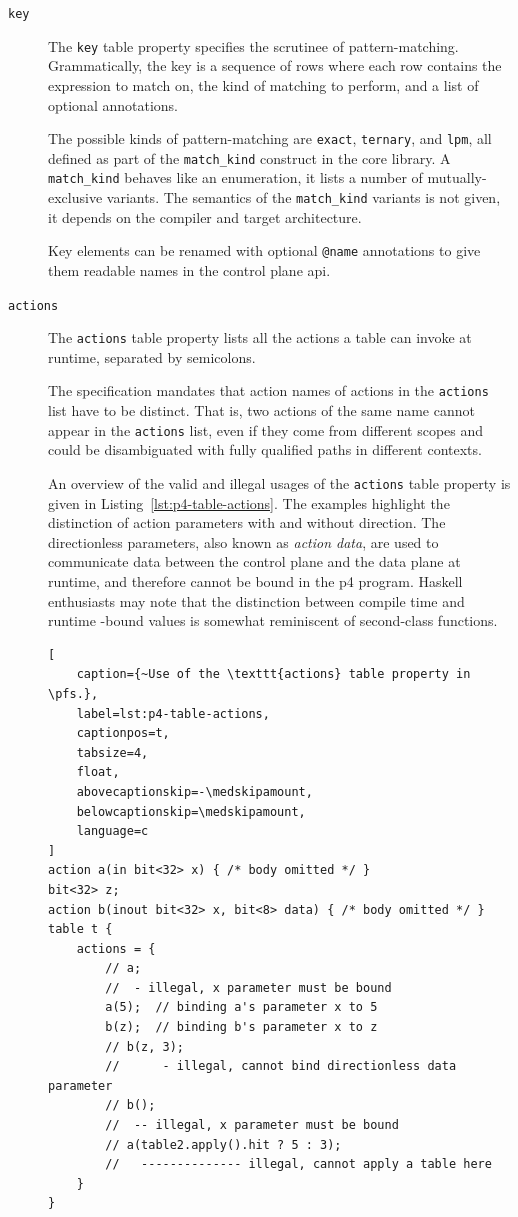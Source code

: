 \begin{description}

\item[\texttt{key}] The \texttt{key} table property specifies the scrutinee of
pattern-matching. Grammatically, the key is a sequence of rows where each row
contains the expression to match on, the kind of matching to perform, and a list
of optional annotations.

The possible kinds of pattern-matching are \texttt{exact}, \texttt{ternary}, and
\texttt{lpm}, all defined as part of the \texttt{match\_kind} construct in the
core library. A
\texttt{match\_kind} behaves like an enumeration, it lists a number of
mutually-exclusive variants. The semantics of the \texttt{match\_kind} variants
is not given, it depends on the compiler and target architecture.

Key elements can be renamed with optional \texttt{@name} annotations to give
them readable names in the control plane \acrshort{api}.

\item[\texttt{actions}] The \texttt{actions} table property lists all the
actions a table can invoke at runtime, separated by semicolons.

The specification mandates that action names of actions in the \texttt{actions}
list have to be distinct. That is, two actions of the same name cannot appear in
the \texttt{actions} list, even if they come from different scopes and could be
disambiguated with fully qualified paths in different contexts.

An overview of the valid and illegal usages of the \texttt{actions} table
property is given in Listing~\ref{lst:p4-table-actions}. The examples highlight
the distinction of action parameters with and without direction. The
directionless parameters, also known as \emph{action data}, are used to
communicate data between the control plane and the data plane at runtime, and
therefore cannot be bound in the \acrshort{p4} program. Haskell enthusiasts may
note that the distinction between compile time and runtime -bound values is
somewhat reminiscent of second-class functions.

\begin{lstlisting}[
	caption={~Use of the \texttt{actions} table property in \pfs.},
	label=lst:p4-table-actions,
	captionpos=t,
	tabsize=4,
	float,
	abovecaptionskip=-\medskipamount,
	belowcaptionskip=\medskipamount,
	language=c
]
action a(in bit<32> x) { /* body omitted */ }
bit<32> z;
action b(inout bit<32> x, bit<8> data) { /* body omitted */ }
table t {
	actions = {
		// a;
		//  - illegal, x parameter must be bound
		a(5);  // binding a's parameter x to 5
		b(z);  // binding b's parameter x to z
		// b(z, 3);
		//      - illegal, cannot bind directionless data parameter
		// b();
		//  -- illegal, x parameter must be bound
		// a(table2.apply().hit ? 5 : 3);
		//   -------------- illegal, cannot apply a table here
	}
}
\end{lstlisting}


\end{description}
